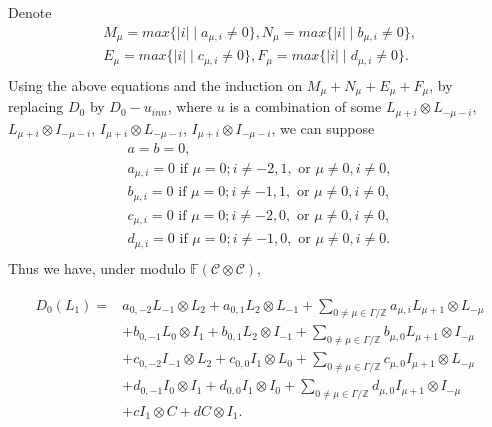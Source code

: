 \documentclass{amsart}
\theoremstyle{definition}
\theoremstyle{remark}
\numberwithin{equation}{subsection}
\numberwithin{equation}{section}
\begin{document}
Denote
$$\begin{array}{l}
 M_\mu=max\{|i|\mid a_{\mu,i}\neq 0 \},
 N_\mu=max\{|i|\mid b_{\mu,i}\neq 0 \}, \\[12pt]
E_\mu=max\{|i|\mid c_{\mu,i}\neq 0 \},
F_\mu=max\{|i|\mid d_{\mu,i}\neq 0\}.  \\[12pt]
\end{array}$$
 Using the above equations and the induction on
 $M_\mu+N_\mu+E_\mu+F_\mu$, by replacing $D_0$ by $D_0-u_{inn}$,
 where $u$ is a combination of some $L_{\mu+i} \otimes L_{-\mu-i}$, $L_{\mu+i} \otimes I_{-\mu-i}$,
 $I_{\mu+i} \otimes L_{-\mu-i}$, $I_{\mu+i} \otimes I_{-\mu-i}$, we
 can suppose
  $$\begin{array}{l}
  a= b=0,   \\[12pt]
  a_{\mu,i} =0  \mbox{ if } \mu=0; i\neq -2, 1,  \mbox{ or } \mu\neq 0,i\neq 0,\\[12pt]
  b_{\mu,i} =0  \mbox{ if } \mu=0; i\neq -1, 1,  \mbox{ or } \mu\neq 0,i\neq 0,\\[12pt]
  c_{\mu,i} =0  \mbox{ if } \mu=0; i\neq -2, 0,  \mbox{ or } \mu\neq 0,i\neq 0,\\[12pt]
  d_{\mu,i} =0  \mbox{ if } \mu=0; i\neq -1, 0,  \mbox{ or } \mu\neq 0,i\neq 0.\\[12pt]
  \end{array}$$
Thus we have, under modulo $\mathbb{F}(\mathcal {C}\otimes \mathcal
{C})$,

\begin{eqnarray}\label{equa2.10}
\begin{split}
 D_0(L_1)=& a_{0,-2}L_{-1}\otimes L_2+ a_{0,1}L_2\otimes L_{-1}+
 \underset{0\neq\mu\in \Gamma/\mathbb{Z}}{\sum}{a_{\mu,i} L_{\mu+1} \otimes
 L_{-\mu}}  \\&
 + b_{0,-1}L_0\otimes I_1 + b_{0,1}L_2\otimes I_{-1}
 +\underset{0\neq\mu\in \Gamma/\mathbb{Z}}{\sum}{b_{\mu,0}
 L_{\mu+1} \otimes I_{-\mu}}    \\&
 + c_{0,-2}I_{-1}\otimes L_2 + c_{0,0}I_1\otimes
 L_0 +\underset{0\neq\mu\in \Gamma/\mathbb{Z}}{\sum}{c_{\mu,0}I_{\mu+1} \otimes L_{-\mu}}
 \\&
 +d_{0,-1} I_0 \otimes I_1+d_{0,0} I_1 \otimes I_0+\underset{0\neq\mu\in \Gamma/\mathbb{Z}}{\sum}{d_{\mu,0}I_{\mu+1} \otimes I_{-\mu}}\\&
+c I_{1}\otimes C +d C \otimes I_{1}.
\end{split}
\end{eqnarray}
\end{document}
